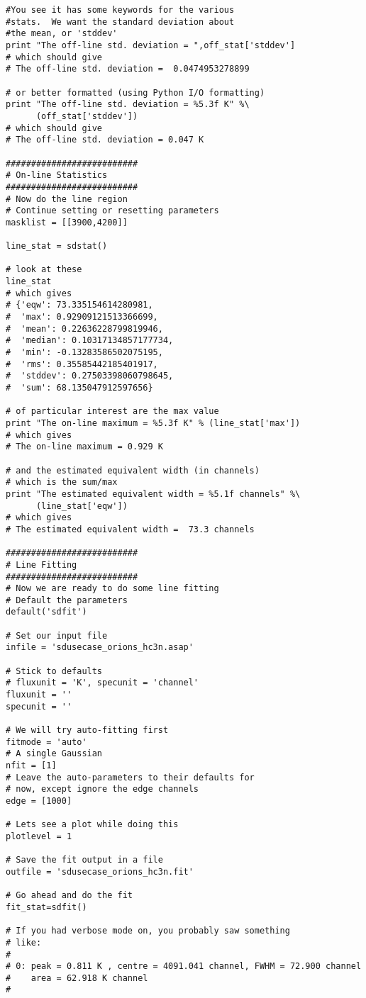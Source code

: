 \begin{verbatim}
#You see it has some keywords for the various
#stats.  We want the standard deviation about
#the mean, or 'stddev'
print "The off-line std. deviation = ",off_stat['stddev']
# which should give
# The off-line std. deviation =  0.0474953278899

# or better formatted (using Python I/O formatting)
print "The off-line std. deviation = %5.3f K" %\
      (off_stat['stddev'])
# which should give
# The off-line std. deviation = 0.047 K

##########################
# On-line Statistics
##########################
# Now do the line region
# Continue setting or resetting parameters
masklist = [[3900,4200]]

line_stat = sdstat()

# look at these
line_stat
# which gives
# {'eqw': 73.335154614280981,
#  'max': 0.92909121513366699,
#  'mean': 0.22636228799819946,
#  'median': 0.10317134857177734,
#  'min': -0.13283586502075195,
#  'rms': 0.35585442185401917,
#  'stddev': 0.27503398060798645,
#  'sum': 68.135047912597656}

# of particular interest are the max value
print "The on-line maximum = %5.3f K" % (line_stat['max'])
# which gives
# The on-line maximum = 0.929 K

# and the estimated equivalent width (in channels)
# which is the sum/max
print "The estimated equivalent width = %5.1f channels" %\
      (line_stat['eqw'])
# which gives
# The estimated equivalent width =  73.3 channels

##########################
# Line Fitting
##########################
# Now we are ready to do some line fitting
# Default the parameters
default('sdfit')

# Set our input file
infile = 'sdusecase_orions_hc3n.asap'

# Stick to defaults
# fluxunit = 'K', specunit = 'channel'
fluxunit = ''
specunit = ''

# We will try auto-fitting first
fitmode = 'auto'
# A single Gaussian
nfit = [1]
# Leave the auto-parameters to their defaults for
# now, except ignore the edge channels
edge = [1000]

# Lets see a plot while doing this
plotlevel = 1

# Save the fit output in a file
outfile = 'sdusecase_orions_hc3n.fit'

# Go ahead and do the fit
fit_stat=sdfit()

# If you had verbose mode on, you probably saw something
# like:
#
# 0: peak = 0.811 K , centre = 4091.041 channel, FWHM = 72.900 channel
#    area = 62.918 K channel
#


\end{verbatim}
